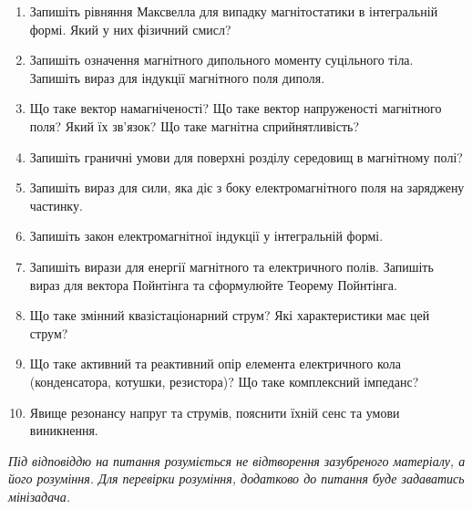 \documentclass[12pt]{article}
\begin{document}
\begin{enumerate}
\item Запишіть рівняння Максвелла для випадку магнітостатики в інтегральній формі. Який у них фізичний смисл?
\item Запишіть означення магнітного дипольного моменту суцільного тіла. Запишіть вираз для індукції магнітного поля  диполя.
\item Що таке вектор намагніченості? Що таке вектор напруженості магнітного поля? Який їх зв'язок? Що таке магнітна сприйнятливість?
\item Запишіть граничні умови для поверхні розділу середовищ в магнітному полі?
\item Запишіть вираз для сили, яка діє з боку електромагнітного поля на заряджену частинку.
\item Запишіть закон електромагнітної індукції у інтегральній формі.
\item Запишіть вирази для енергії магнітного та електричного полів. Запишіть вираз для вектора Пойнтінга та сформулюйте Теорему Пойнтінга.
\item Що таке змінний квазістаціонарний струм? Які характеристики має цей струм?
\item Що таке активний та реактивний опір елемента електричного кола (конденсатора, котушки, резистора)? Що таке комплексний імпеданс?
\item Явище резонансу напруг та струмів, пояснити їхній сенс та умови виникнення.
\end{enumerate}

\bigskip

\emph{Під відповіддю на питання розуміється не відтворення зазубреного матеріалу, а його розуміння. Для перевірки розуміння, додатково до питання буде задаватись мінізадача.}
\end{document}
